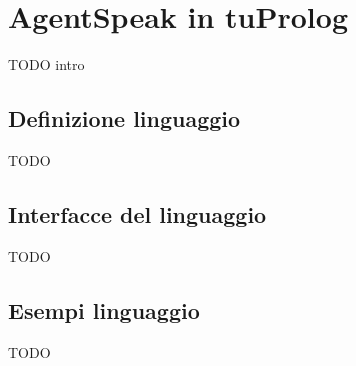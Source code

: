 \chapter{AgentSpeak in tuProlog}
TODO intro

\section{Definizione linguaggio}
TODO

\section{Interfacce del linguaggio}
TODO

\section{Esempi linguaggio}
TODO
